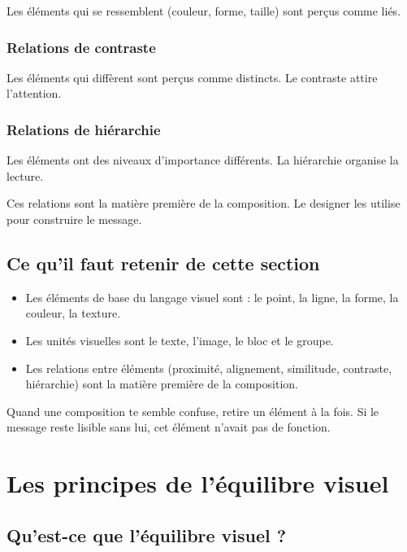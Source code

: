 Les éléments qui se ressemblent (couleur, forme, taille) sont perçus comme liés.

\subsubsection{Relations de contraste}

Les éléments qui diffèrent sont perçus comme distincts. Le contraste attire l'attention.

\subsubsection{Relations de hiérarchie}

Les éléments ont des niveaux d'importance différents. La hiérarchie organise la lecture.

Ces relations sont la matière première de la composition. Le designer les utilise pour construire le message.

\subsection{Ce qu'il faut retenir de cette section}

\begin{retenir}
\begin{itemize}
  \item Les éléments de base du langage visuel sont : le point, la ligne, la forme, la couleur, la texture.
  \item Les unités visuelles sont le texte, l'image, le bloc et le groupe.
  \item Les relations entre éléments (proximité, alignement, similitude, contraste, hiérarchie) sont la matière première de la composition.
\end{itemize}
\end{retenir}

\begin{astuce}
Quand une composition te semble confuse, retire un élément à la fois. Si le message reste lisible sans lui, cet élément n'avait pas de fonction.
\end{astuce}

\section{Les principes de l'équilibre visuel}

\subsection{Qu'est-ce que l'équilibre visuel ?}

